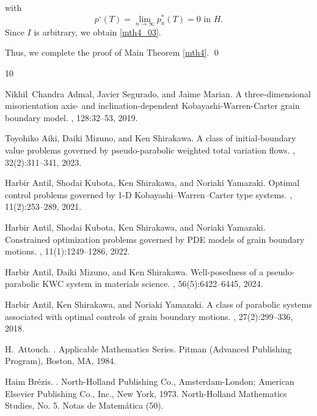 \documentclass{sinst}
\numberwithin{equation}{section}
\theoremstyle{plain}
\theoremstyle{definition}
\begin{document}
with
\begin{equation}
  p^\circ(T) = \lim_{n \to \infty} p_n^*(T) = 0 \mbox{ in } H.
\end{equation}
Since $I$ is arbitrary, we obtain \eqref{mth4_03}.

Thus, we complete the proof of Main Theorem \ref{mth4}. 
\qed

%

\begin{thebibliography}{10}

Nikhil~Chandra Admal, Javier Segurado, and Jaime Marian.
\newblock A three-dimensional misorientation axis- and inclination-dependent
  {K}obayashi-{W}arren-{C}arter grain boundary model.
, 128:32--53, 2019.

Toyohiko Aiki, Daiki Mizuno, and Ken Shirakawa.
\newblock A class of initial-boundary value problems governed by
  pseudo-parabolic weighted total variation flows.
, 32(2):311--341, 2023.

Harbir Antil, Shodai Kubota, Ken Shirakawa, and Noriaki Yamazaki.
\newblock Optimal control problems governed by 1-{D}
  {K}obayashi--{W}arren--{C}arter type systems.
, 11(2):253--289, 2021.

Harbir Antil, Shodai Kubota, Ken Shirakawa, and Noriaki Yamazaki.
\newblock Constrained optimization problems governed by {PDE} models of grain
  boundary motions.
, 11(1):1249--1286, 2022.

Harbir Antil, Daiki Mizuno, and Ken Shirakawa.
\newblock Well-posedness of a pseudo-parabolic {KWC} system in materials
  science.
, 56(5):6422--6445, 2024.

Harbir Antil, Ken Shirakawa, and Noriaki Yamazaki.
\newblock A class of parabolic systems associated with optimal controls of
  grain boundary motions.
, 27(2):299--336, 2018.

H.~Attouch.
.
\newblock Applicable Mathematics Series. Pitman (Advanced Publishing Program),
  Boston, MA, 1984.

Haim Br\'ezis.
.
\newblock North-Holland Publishing Co., Amsterdam-London; American Elsevier
  Publishing Co., Inc., New York, 1973.
\newblock North-Holland Mathematics Studies, No. 5. Notas de Matem\'atica (50).


\end{thebibliography}
\end{document}
